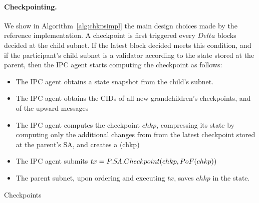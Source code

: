\paragraph{Checkpointing.} We show in Algorithm~\cref{alg:chkpsimpl} the main design choices made by the reference implementation. A checkpoint is first triggered every $Delta$ blocks decided at the child subnet. If the latest block decided meets this condition, and if the participant's child subnet is a validator according to the state stored at the parent, then the IPC agent starts computing the checkpoint as follows:
\begin{itemize}
    \item The IPC agent obtains a state snapshot from the child's subnet.
    \item The IPC agent obtains the CIDs of all new grandchildren's checkpoints, and of the upward \postoffice messages
    \item The IPC agent computes the checkpoint $chkp$, compressing its state by computing only the additional changes from from the latest checkpoint stored at the parent's SA, and creates a \pof(chkp)
    \item The IPC agent submits $tx=P.\textit{SA}.Checkpoint(chkp, PoF(chkp))$
    \item The parent subnet, upon ordering and executing $tx$, saves $chkp$ in the state.  
\end{itemize}

\begin{algorithm}[H]
\footnotesize
\caption{Checkpoints \impl}\label{alg:chkpsimpl}
  \DontPrintSemicolon
  
  
\end{algorithm}


